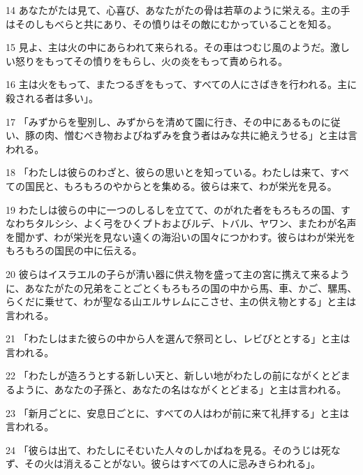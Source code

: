 \par 14 あなたがたは見て、心喜び、あなたがたの骨は若草のように栄える。主の手はそのしもべらと共にあり、その憤りはその敵にむかっていることを知る。
\par 15 見よ、主は火の中にあらわれて来られる。その車はつむじ風のようだ。激しい怒りをもってその憤りをもらし、火の炎をもって責められる。
\par 16 主は火をもって、またつるぎをもって、すべての人にさばきを行われる。主に殺される者は多い」。
\par 17 「みずからを聖別し、みずからを清めて園に行き、その中にあるものに従い、豚の肉、憎むべき物およびねずみを食う者はみな共に絶えうせる」と主は言われる。
\par 18 「わたしは彼らのわざと、彼らの思いとを知っている。わたしは来て、すべての国民と、もろもろのやからとを集める。彼らは来て、わが栄光を見る。
\par 19 わたしは彼らの中に一つのしるしを立てて、のがれた者をもろもろの国、すなわちタルシシ、よく弓をひくプトおよびルデ、トバル、ヤワン、またわが名声を聞かず、わが栄光を見ない遠くの海沿いの国々につかわす。彼らはわが栄光をもろもろの国民の中に伝える。
\par 20 彼らはイスラエルの子らが清い器に供え物を盛って主の宮に携えて来るように、あなたがたの兄弟をことごとくもろもろの国の中から馬、車、かご、騾馬、らくだに乗せて、わが聖なる山エルサレムにこさせ、主の供え物とする」と主は言われる。
\par 21 「わたしはまた彼らの中から人を選んで祭司とし、レビびととする」と主は言われる。
\par 22 「わたしが造ろうとする新しい天と、新しい地がわたしの前にながくとどまるように、あなたの子孫と、あなたの名はながくとどまる」と主は言われる。
\par 23 「新月ごとに、安息日ごとに、すべての人はわが前に来て礼拝する」と主は言われる。
\par 24 「彼らは出て、わたしにそむいた人々のしかばねを見る。そのうじは死なず、その火は消えることがない。彼らはすべての人に忌みきらわれる」。


